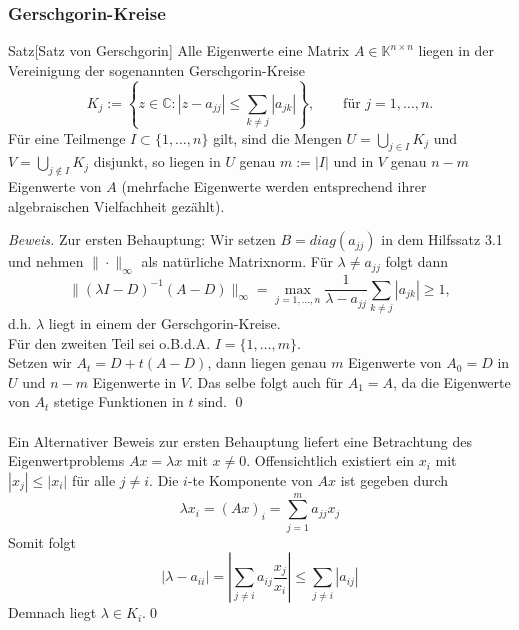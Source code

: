 \subsubsection{Gerschgorin-Kreise}
\begin{thmbox}{Satz}[Satz von Gerschgorin]
    Alle Eigenwerte eine Matrix $A\in\mathbb{K}^{n\times n}$ liegen in der Vereinigung der sogenannten 
    Gerschgorin-Kreise
    \[K_j := \left\{z\in\mathbb{C} : |z-a_{jj}|\leq \sum_{k\neq j} |a_{jk}|\right\},
    \qquad \text{für } j=1,\dotsc,n.\]
    Für eine Teilmenge $I\subset\{1,\dotsc,n\}$ gilt, sind die Mengen $U=\displaystyle \bigcup_{j\in I} K_j$ 
    und $V=\displaystyle \bigcup_{j\notin I} K_j$ disjunkt, so liegen in $U$ genau $m:=|I|$ und in $V$ genau $n-m$ 
    Eigenwerte von $A$ (mehrfache Eigenwerte werden entsprechend ihrer algebraischen Vielfachheit gezählt).
\end{thmbox}
\textit{Beweis.} Zur ersten Behauptung: Wir setzen $B=diag(a_{jj})$ in dem Hilfssatz 3.1 und nehmen 
$\|\cdot\|_\infty$ als natürliche Matrixnorm. Für $\lambda\neq a_{jj}$ folgt dann 
\[\|(\lambda I -D)^{-1}(A-D)\|_\infty = \max_{j=1,\dotsc,n}\dfrac{1}{\lambda-a_{jj}}\sum_{k\neq j} |a_{jk}|\geq 1,\]
d.h. $\lambda$ liegt in einem der Gerschgorin-Kreise. \\
Für den zweiten Teil sei o.B.d.A. $I=\{1,\dotsc,m\}$. \\
Setzen wir $A_t = D + t(A-D)$, dann liegen genau $m$ Eigenwerte von $A_0=D$ in $U$ und $n-m$ 
Eigenwerte in $V$. Das selbe folgt auch für $A_1=A$, da die Eigenwerte von $A_t$ stetige Funktionen in $t$ sind. 
\qed \\ \\
Ein Alternativer Beweis zur ersten Behauptung liefert eine Betrachtung des 
Eigenwertproblems $Ax=\lambda x$ mit $x\neq 0$. Offensichtlich existiert ein $x_i$ mit $|x_j|\leq |x_i|$ für alle 
$j\neq i$. Die $i$-te Komponente von $Ax$ ist gegeben durch 
\[\lambda x_i = (Ax)_i = \sum_{j=1}^{m} a_{jj}x_j \]
Somit folgt 
\[|\lambda-a_{ii}| = \left|\sum_{j\neq i} a_{ij} \dfrac{x_j}{x_i}\right|\leq \sum_{j\neq i}|a_{ij}|\]
Demnach liegt $\lambda\in K_i$.\qed
